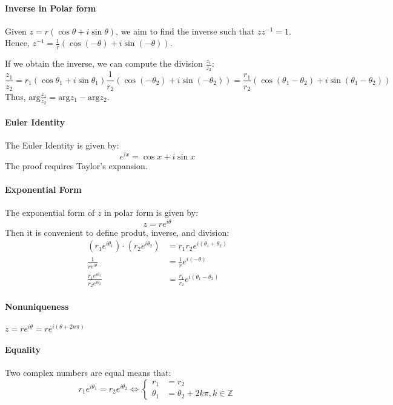 \paragraph{Inverse in Polar form}
Given $z=r(\cos\theta+i\sin\theta)$, we aim to find the inverse such that $zz^{-1}=1$. Hence, $z^{-1}=\frac{1}{r}(\cos(-\theta)+i\sin(-\theta))$.

If we obtain the inverse, we can compute the division $\frac{z_1}{z_2}$:
\[
\frac{z_1}{z_2} =r_1(\cos\theta_1+i\sin\theta_1)\frac{1}{r_2}(\cos(-\theta_2)+i\sin(-\theta_2))
=
\frac{r_1}{r_2}(\cos(\theta_1-\theta_2) + i\sin(\theta_1-\theta_2))
\]
Thus, $\mbox{arg}\frac{z_1}{z_2} =\mbox{arg}z_1 - \mbox{arg}z_2$.

\paragraph{Euler Identity}
The Euler Identity is given by:
\[
e^{ix}  = \cos x+i\sin x
\]
The proof requires Taylor's expansion.

\paragraph{Exponential Form}
The exponential form of $z$ in polar form is given by:
\[
z = re^{i\theta}
\]
Then it is convenient to define produt, inverse, and division:
\begin{align*}
(r_1e^{i\theta_1})\cdot(r_2e^{i\theta_2})&=
r_1r_2e^{i(\theta_1+\theta_2)}\\
\frac{1}{re^{i\theta}}&=\frac{1}{r}e^{i(-\theta)}\\
\frac{r_1e^{i\theta_1}}{r_2e^{i\theta_2}}&=\frac{r_1}{r_2}e^{i(\theta_1-\theta_2)}
\end{align*}

\paragraph{Nonuniqueness} $z=re^{i\theta} = re^{i(\theta+2n\pi)}$


\paragraph{Equality} Two complex numbers are equal means that:
\[
r_1e^{i\theta_1}=r_2e^{i\theta_2}
\Longleftrightarrow
\left\{
\begin{aligned}
r_1&=r_2\\
\theta_1&=\theta_2+2k\pi,k\in\mathbb{Z}
\end{aligned}
\right.
\]

